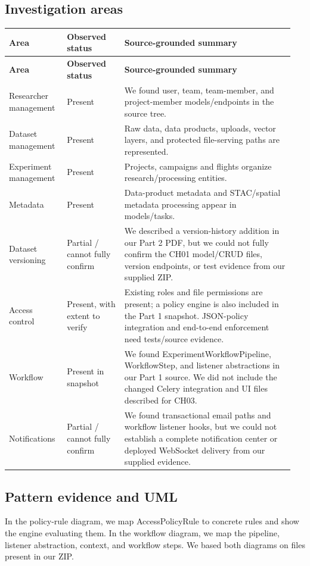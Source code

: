 \documentclass[11pt,a4paper]{article}
\begin{document}
\subsection{Investigation areas}
\small
\begin{longtable}{@{}L{0.19\linewidth}L{0.19\linewidth}L{0.57\linewidth}@{}}
\toprule
\textbf{Area} & \textbf{Observed status} & \textbf{Source-grounded summary}\\
\midrule\endfirsthead
\toprule
\textbf{Area} & \textbf{Observed status} & \textbf{Source-grounded summary}\\
\midrule\endhead
\bottomrule\endfoot
Researcher management & Present & We found user, team, team-member, and project-member models/endpoints in the source tree.\\
Dataset management & Present & Raw data, data products, uploads, vector layers, and protected file-serving paths are represented.\\
Experiment management & Present & Projects, campaigns and flights organize research/processing entities.\\
Metadata & Present & Data-product metadata and STAC/spatial metadata processing appear in models/tasks.\\
Dataset versioning & Partial / cannot fully confirm & We described a version-history addition in our Part 2 PDF, but we could not fully confirm the CH01 model/CRUD files, version endpoints, or test evidence from our supplied ZIP.\\
Access control & Present, with extent to verify & Existing roles and file permissions are present; a policy engine is also included in the Part 1 snapshot. JSON-policy integration and end-to-end enforcement need tests/source evidence.\\
Workflow & Present in snapshot & We found ExperimentWorkflowPipeline, WorkflowStep, and listener abstractions in our Part 1 source. We did not include the changed Celery integration and UI files described for CH03.\\
Notifications & Partial / cannot fully confirm & We found transactional email paths and workflow listener hooks, but we could not establish a complete notification center or deployed WebSocket delivery from our supplied evidence.\\
\end{longtable}
\normalsize

\subsection{Pattern evidence and UML}
In the policy-rule diagram, we map AccessPolicyRule to concrete rules and show the engine evaluating them. In the workflow diagram, we map the pipeline, listener abstraction, context, and workflow steps. We based both diagrams on files present in our ZIP.
\end{document}
